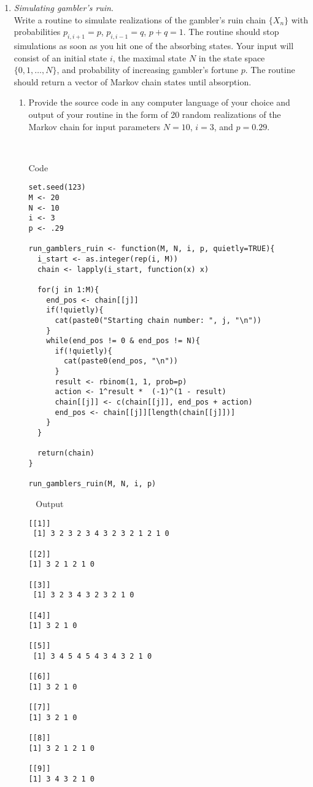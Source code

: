 \documentclass{article} %
\begin{document}
\begin{enumerate}
\item {\em Simulating gambler's ruin}.\\ Write a routine to simulate
  realizations of the gambler's ruin chain $\{X_n\}$ with
  probabilities $p_{i,i+1} = p$, $p_{i,i-1} = q$, $p + q = 1$. The
  routine should stop simulations as soon as you hit one of the
  absorbing states. Your input will consist of an initial state $i$,
  the maximal state $N$ in the state space $\{0,1,\dots,N\}$, and
  probability of increasing gambler's fortune $p$. The routine should
  return a vector of Markov chain states until absorption.
  \begin{enumerate}
  \item Provide the source code in any computer language of your
    choice and output of your routine in the form of 20 random realizations of the Markov chain for 
    input parameters $N = 10$, $i = 3$, and $p = 0.29$.  

~

Code

\begin{verbatim}
set.seed(123)
M <- 20
N <- 10
i <- 3
p <- .29

run_gamblers_ruin <- function(M, N, i, p, quietly=TRUE){
  i_start <- as.integer(rep(i, M))
  chain <- lapply(i_start, function(x) x)

  for(j in 1:M){
    end_pos <- chain[[j]]
    if(!quietly){
      cat(paste0("Starting chain number: ", j, "\n"))
    }
    while(end_pos != 0 & end_pos != N){
      if(!quietly){
        cat(paste0(end_pos, "\n"))
      }
      result <- rbinom(1, 1, prob=p)
      action <- 1^result *  (-1)^(1 - result)
      chain[[j]] <- c(chain[[j]], end_pos + action)
      end_pos <- chain[[j]][length(chain[[j]])]
    }
  }
  
  return(chain)
}

run_gamblers_ruin(M, N, i, p)
\end{verbatim}
~
Output
\begin{verbatim}
[[1]]
 [1] 3 2 3 2 3 4 3 2 3 2 1 2 1 0

[[2]]
[1] 3 2 1 2 1 0

[[3]]
 [1] 3 2 3 4 3 2 3 2 1 0

[[4]]
[1] 3 2 1 0

[[5]]
 [1] 3 4 5 4 5 4 3 4 3 2 1 0

[[6]]
[1] 3 2 1 0

[[7]]
[1] 3 2 1 0

[[8]]
[1] 3 2 1 2 1 0

[[9]]
[1] 3 4 3 2 1 0


\end{verbatim}
\end{enumerate}
\end{enumerate}
\end{document}
